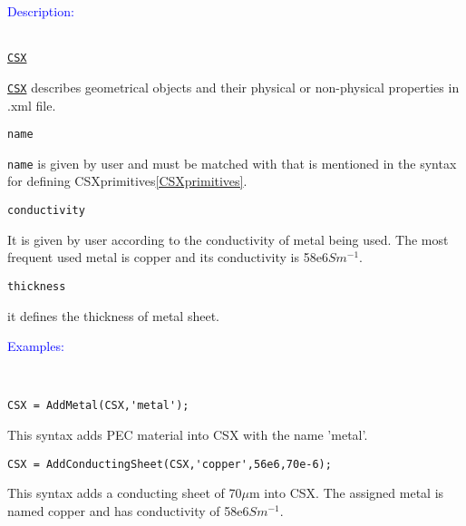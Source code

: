 \textcolor{blue}{\begin{large}Description:\end{large}}\\ 
\hyperref[para:CSX]{\texttt{CSX}} 
 \begin{myindentpar}\hyperref[para:CSX]{\texttt{CSX}} describes geometrical objects and their physical or non-physical properties in .xml file.
 \end{myindentpar} 
 \texttt{name} 
 \begin{myindentpar}{\texttt{name}} is given by user and must be matched with that is mentioned in the syntax for defining CSXprimitives\ref{CSXprimitives}.  
 \end{myindentpar} 
 \texttt{conductivity} 
 \begin{myindentpar} It is given by user according to the conductivity of metal being used. The most frequent used metal is copper and its conductivity is 58e6$Sm^{-1}$.    
 \end{myindentpar}
 \texttt{thickness} 
 \begin{myindentpar} it defines the thickness of metal sheet.     
 \end{myindentpar}

\textcolor{blue}{\begin{large}Examples:\end{large}}\\  

\begin{lstlisting} 
CSX = AddMetal(CSX,'metal'); 
\end{lstlisting}

This syntax adds PEC material into CSX with the name 'metal'. 

\begin{lstlisting} 
CSX = AddConductingSheet(CSX,'copper',56e6,70e-6);
\end{lstlisting}

This syntax adds a conducting sheet of 70$\mu$m into CSX. The assigned metal is named copper and has conductivity of 58e6$Sm^{-1}$.  

 
 
 
 
 
